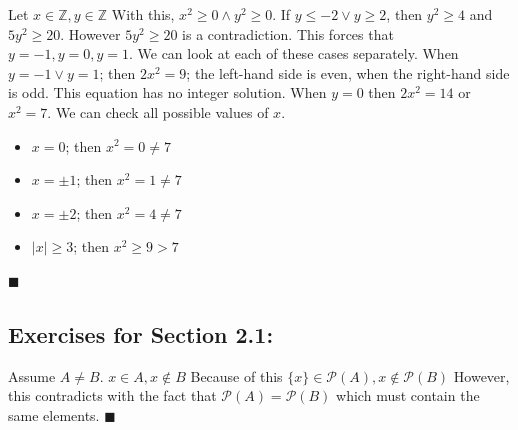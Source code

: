 \documentclass[12pt]{article}  %
\newcommand{\AND}{\wedge}
\newcommand{\OR}{\vee}
\begin{document}
\clearpage

\newline
{}\newline
Let $x\in\mathbb{Z},y\in\mathbb{Z}$\newline
With this, $x^2\geq0\AND y^2\geq0$.\newline
If $y\leq-2\OR y\geq2$, then $y^2\geq4$ and $5y^2\geq20$. However $5y^2\geq20$ is a contradiction. This forces that $y=-1,y=0,y=1$. We can look at each of these cases separately.\newline
\newline
When $y=-1\OR y=1$; then $2x^2=9$; the left-hand side is even, when the right-hand side is odd. This equation has no integer solution.\newline
\newline
When $y=0$ then $2x^2=14$ or $x^2=7$. We can check all possible values of $x$.
\begin{itemize}
    \item $x=0$; then $x^2=0\neq7$
    \item $x=\pm1$; then $x^2=1\neq7$
    \item $x=\pm2$; then $x^2=4\neq7$
    \item $|x|\geq3$; then $x^2\geq9>7$
\end{itemize}

\newline
$\blacksquare$

\clearpage

\subsection*{Exercises for Section 2.1:}     

\newline
{}\newline
Assume $A\neq B$.\newline
$x\in A, x\not\in B$\newline
Because of this $\{x\}\in\mathcal{P}(A), {x}\not\in\mathcal{P}(B)$\newline
However, this contradicts with the fact that $\mathcal{P}(A)=\mathcal{P}(B)$ which must contain the same elements.\newline
$\blacksquare$
\newline
\end{document}
